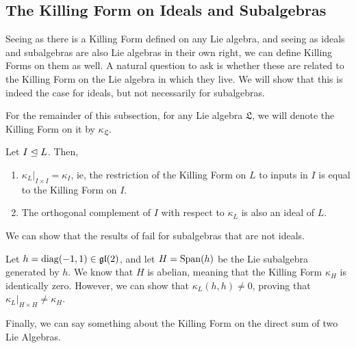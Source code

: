 \subsection{The Killing Form on Ideals and Subalgebras}

Seeing as there is a Killing Form defined on any Lie algebra, and seeing as ideals and subalgebras are also Lie algebras in their own right, we can define Killing Forms on them as well. A natural question to ask is whether these are related to the Killing Form on the Lie algebra in which they live. We will show that this is indeed the case for ideals, but not necessarily for subalgebras.

For the remainder of this subsection, for any Lie algebra $\mathfrak{L}$, we will denote the Killing Form on it by $\kappa_{\mathfrak{L}}$.

\begin{boxproposition}\label{Ch2:Prop:KillingIdeal}
    Let $I \trianglelefteq L$. Then,
    \begin{enumerate}[label = \normalfont \arabic*.]
        \item $\kappa_L\vert_{I \times I} = \kappa_{I}$, ie, the restriction of the Killing Form on $L$ to inputs in $I$ is equal to the Killing Form on $I$.
        \item The orthogonal complement of $I$ with respect to $\kappa_L$ is also an ideal of $L$.
    \end{enumerate}
\end{boxproposition}

We can show that the results of  fail for subalgebras that are not ideals.

\begin{boxcexample}
    Let $h = \operatorname{diag}\!\left( -1, 1 \right) \in \mathfrak{gl}\!\left( 2 \right)$, and let $H = \operatorname{Span}\!\left( h \right)$ be the Lie subalgebra generated by $h$. We know that $H$ is abelian, meaning that the Killing Form $\kappa_H$ is identically zero. However, we can show that $\kappa_L(h, h) \neq 0$, proving that $\kappa_L\vert_{H \times H} \neq \kappa_H$.
\end{boxcexample}

Finally, we can say something about the Killing Form on the direct sum of two Lie Algebras.



